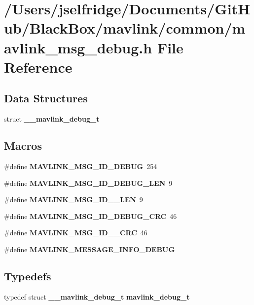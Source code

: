 \section{/\+Users/jselfridge/\+Documents/\+Git\+Hub/\+Black\+Box/mavlink/common/mavlink\+\_\+msg\+\_\+debug.h File Reference}
\label{mavlink__msg__debug_8h}
\subsection*{Data Structures}
\begin{DoxyCompactItemize}
\item 
struct \textbf{ \+\_\+\+\_\+mavlink\+\_\+debug\+\_\+t}
\end{DoxyCompactItemize}
\subsection*{Macros}
\begin{DoxyCompactItemize}
\item 
\#define \textbf{ M\+A\+V\+L\+I\+N\+K\+\_\+\+M\+S\+G\+\_\+\+I\+D\+\_\+\+D\+E\+B\+UG}~254
\item 
\#define \textbf{ M\+A\+V\+L\+I\+N\+K\+\_\+\+M\+S\+G\+\_\+\+I\+D\+\_\+\+D\+E\+B\+U\+G\+\_\+\+L\+EN}~9
\item 
\#define \textbf{ M\+A\+V\+L\+I\+N\+K\+\_\+\+M\+S\+G\+\_\+\+I\+D\+\_\+\_\+\+L\+EN}~9
\item 
\#define \textbf{ M\+A\+V\+L\+I\+N\+K\+\_\+\+M\+S\+G\+\_\+\+I\+D\+\_\+\+D\+E\+B\+U\+G\+\_\+\+C\+RC}~46
\item 
\#define \textbf{ M\+A\+V\+L\+I\+N\+K\+\_\+\+M\+S\+G\+\_\+\+I\+D\+\_\+\_\+\+C\+RC}~46
\item 
\#define \textbf{ M\+A\+V\+L\+I\+N\+K\+\_\+\+M\+E\+S\+S\+A\+G\+E\+\_\+\+I\+N\+F\+O\+\_\+\+D\+E\+B\+UG}
\end{DoxyCompactItemize}
\subsection*{Typedefs}
\begin{DoxyCompactItemize}
\item 
typedef struct \textbf{ \+\_\+\+\_\+mavlink\+\_\+debug\+\_\+t} \textbf{ mavlink\+\_\+debug\+\_\+t}
\end{DoxyCompactItemize}



